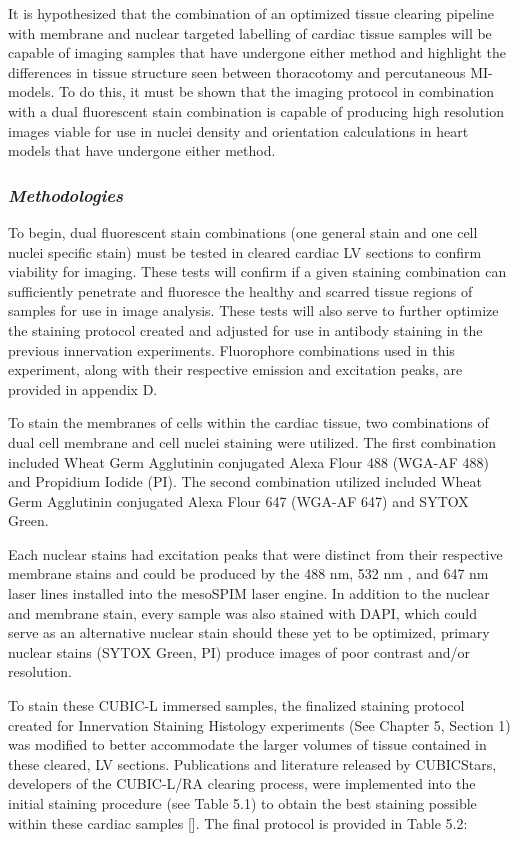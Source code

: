 It is hypothesized that the combination of an optimized tissue clearing pipeline with membrane and nuclear targeted labelling of cardiac tissue samples will be capable of imaging samples that have undergone either method and highlight the differences in tissue structure seen between thoracotomy and percutaneous MI-models. To do this, it must be shown that the imaging protocol in combination with a dual fluorescent stain combination is capable of producing high resolution images viable for use in nuclei density and orientation calculations in heart models that have undergone either method.

\subsubsection{\textit{Methodologies}}

To begin, dual fluorescent stain combinations (one general stain and one cell nuclei specific stain) must be tested in cleared cardiac LV sections to confirm viability for imaging. These tests will confirm if a given staining combination can sufficiently penetrate and fluoresce the healthy and scarred tissue regions of samples for use in image analysis. These tests will also serve to further optimize the staining protocol created and adjusted for use in antibody staining in the previous innervation experiments. Fluorophore combinations used in this experiment, along with their respective emission and excitation peaks, are provided in appendix D.

To stain the membranes of cells within the cardiac tissue, two combinations of dual cell membrane and cell nuclei staining were utilized. The first combination included Wheat Germ Agglutinin conjugated Alexa Flour 488 (WGA-AF 488) and Propidium Iodide (PI). The second combination utilized included Wheat Germ Agglutinin conjugated Alexa Flour 647 (WGA-AF 647) and SYTOX Green. 

Each nuclear stains had excitation peaks that were distinct from their respective membrane stains and could be produced by the 488 nm, 532 nm , and 647 nm laser lines installed into the mesoSPIM laser engine. In addition to the  nuclear and membrane stain, every sample was also stained with DAPI, which could serve as an alternative nuclear stain should these yet to be optimized, primary nuclear stains (SYTOX Green, PI) produce images of poor contrast and/or resolution. 

To stain these CUBIC-L immersed samples, the finalized staining protocol created for Innervation Staining Histology experiments (See Chapter 5, Section 1) was modified to better accommodate the larger volumes of tissue contained in these cleared, LV sections. Publications and literature released by CUBICStars, developers of the CUBIC-L/RA clearing process, were implemented into the initial staining procedure (see Table 5.1) to obtain the best staining possible within these cardiac samples []. The final protocol is provided in Table 5.2:

